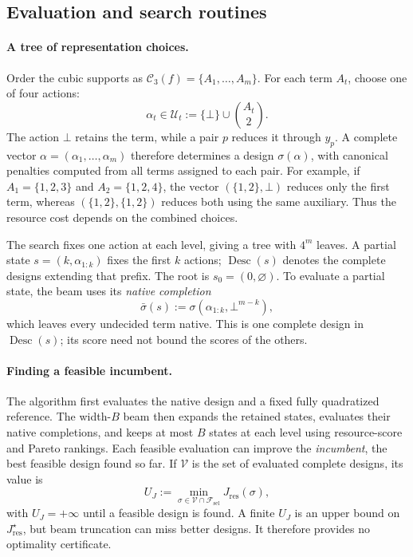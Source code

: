 \documentclass[a4paper,onecolumn,11pt,unpublished]{quantumarticle}
\theoremstyle{remark}
\begin{document}
\subsection{Evaluation and search routines}
\label{app:selector-details}

\paragraph{A tree of representation choices.}
Order the cubic supports as \(\mathcal C_3(f)=\{A_1,\ldots,A_m\}\).
For each term \(A_t\), choose one of four actions:
\[
\alpha_t\in\mathcal U_t:=\{\bot\}\cup\binom{A_t}{2}.
\]
The action \(\bot\) retains the term, while a pair \(p\) reduces it through
\(y_p\).  A complete vector \(\alpha=(\alpha_1,\ldots,\alpha_m)\) therefore
determines a design \(\sigma(\alpha)\), with canonical penalties computed
from all terms assigned to each pair.  For example, if
\(A_1=\{1,2,3\}\) and \(A_2=\{1,2,4\}\), the vector
\((\{1,2\},\bot)\) reduces only the first term, whereas
\((\{1,2\},\{1,2\})\) reduces both using the same auxiliary.
Thus the resource cost depends on the combined choices.

The search fixes one action at each level, giving a tree with \(4^m\)
leaves.  A partial state \(s=(k,\alpha_{1:k})\) fixes the first \(k\)
actions; \(\operatorname{Desc}(s)\) denotes the complete designs extending
that prefix.  The root is \(s_0=(0,\varnothing)\).  To evaluate a partial
state, the beam uses its \emph{native completion}
\[
\bar\sigma(s):=\sigma(\alpha_{1:k},\bot^{m-k}),
\]
which leaves every undecided term native.  This is one complete design in
\(\operatorname{Desc}(s)\); its score need not bound the scores of the others.

\paragraph{Finding a feasible incumbent.}
The algorithm first evaluates the native design and a fixed fully
quadratized reference.  The width-\(B\) beam then expands the retained states,
evaluates their native completions, and keeps at most \(B\) states at each
level using resource-score and Pareto rankings.  Each feasible evaluation
can improve the \emph{incumbent}, the best feasible design found so far.
If \(\mathcal V\) is the set of evaluated complete designs, its value is
\[
U_J:=\min_{\sigma\in\mathcal V\cap\mathcal F_{\mathrm{sel}}}J_{\mathrm{res}}(\sigma),
\]
with \(U_J=+\infty\) until a feasible design is found.  A finite \(U_J\)
is an upper bound on \(J_{\mathrm{res}}^\star\), but beam truncation can
miss better designs.  It therefore provides no optimality certificate.
\end{document}
